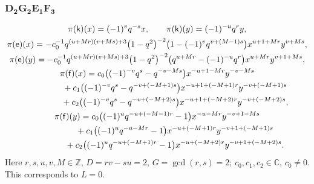 \documentclass[pdftex]{sigma}
\numberwithin{equation}{section}
\begin{document}
\subsubsection*{$\boldsymbol{D_2G_2E_1F_3}$}
\begin{gather*}
\pi(\mathsf{k})(x)= (-1)^vq^{-s}x ,\qquad\pi(\mathsf{k})(y)=(-1)^{-u}q^ry ,\\
\pi(\mathsf{e})(x)= -c_0^{-1}q^{(u+Mr)(v+Ms)+3}\big(1-q^2\big)^{-2}\big(1-(-1)^vq^{v+(M-1)s}\big)x^{u+1+Mr}y^{v+Ms} ,\\
\pi(\mathsf{e})(y)= -c_0^{-1}q^{(u+Mr)(v+Ms)+3}\big(1-q^2\big)^{-2}\big(q^{u+Mr}-(-1)^{-u}q^r\big)x^{u+Mr}y^{v+1+Ms} ,\\
\pi(\mathsf{f})(x)= c_0\big((-1)^{-v}q^s-q^{-v-Ms}\big)x^{-u+1-Mr}y^{-v-Ms}\\
\hphantom{\pi(\mathsf{f})(x)=}{}+ c_1\big((-1)^{-v}q^s-q^{-v+(-M+1)s}\big)x^{-u+1+(-M+1)r}y^{-v+(-M+1)s}\\
\hphantom{\pi(\mathsf{f})(x)=}{}+ c_2\big((-1)^{-v}q^s-q^{-v+(-M+2)s}\big)x^{-u+1+(-M+2)r}y^{-v+(-M+2)s} ,\\
\pi(\mathsf{f})(y)= c_0\big((-1)^uq^{-u+(-M-1)r}-1\big)x^{-u-Mr}y^{-v+1-Ms}\\
\hphantom{\pi(\mathsf{f})(y)=}{} + c_1\big((-1)^uq^{-u-Mr}-1\big)x^{-u+(-M+1)r}y^{-v+1+(-M+1)s}\\
\hphantom{\pi(\mathsf{f})(y)=}{} + c_2\big((-1)^uq^{-u+(-M+1)r}-1\big)x^{-u+(-M+2)r}y^{-v+1+(-M+2)s} .
\end{gather*}
Here $r,s,u,v,M\in\mathbb{Z}$, $D=rv-su=2$, $G=\operatorname{gcd}(r,s)=2$; $c_0,c_1,c_2\in\mathbb{C}$, $c_0\ne 0$. This corresponds to $L=0$.
\end{document}
